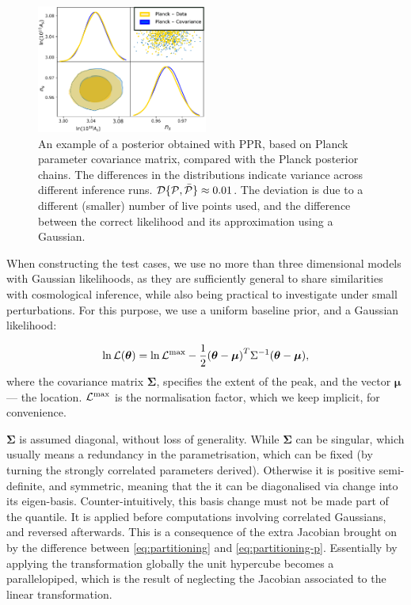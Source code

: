 \documentclass[draft,usenatbib]{mnras}
\begin{document}
\begin{figure}
\includegraphics[width=0.5\textwidth]{./illustrations/triangle-fit.pdf}
\caption{An example of a posterior obtained with PPR, based on
Planck parameter covariance matrix, compared with the Planck
posterior chains. The differences in the distributions indicate
variance across different inference runs.
${\cal D}\{ {\cal P}, \bar{\cal P}\} \approx 0.01$. The deviation
is due to a different (smaller) number of live points used, and
the difference between the correct likelihood and its
approximation using a Gaussian. \label{fig:overlay-posteriors}}
\end{figure}

When constructing the test cases, we use no more than three
dimensional models with Gaussian likelihoods, as they are
sufficiently general to share similarities with cosmological
inference, while also being practical to investigate under small
perturbations.  For this purpose, we use a uniform baseline prior,
and a Gaussian likelihood:

\begin{equation}
\ln {\cal L}(\bm{\theta}) = \ln {\cal L}^\text{max}- \dfrac{1}{2}{(\bm{\theta} - \bm{\mu})}^{T}\Sigma^{-1}(\bm{\theta}-\bm{\mu}),
\end{equation}
where the covariance matrix \(\bm{\Sigma}\), specifies the extent of
the peak, and the vector \(\bm{\mu}\) --- the location.  \({\cal
  L}^\text{max}\) is the normalisation factor, which we keep implicit,
for convenience.

\(\bm{\Sigma}\) is assumed diagonal, without loss of generality. While
\(\bm{\Sigma}\) can be singular, which usually means a redundancy in the
parametrisation, which can be fixed (by turning the strongly
correlated parameters derived). Otherwise it is positive
semi-definite, and symmetric, meaning that the it can be diagonalised
via change into its eigen-basis. Counter-intuitively, this basis change must
not be made part of the quantile. It is applied before computations
involving correlated Gaussians, and reversed afterwards. This is a
consequence of the extra Jacobian brought on by the difference between
\cref{eq:partitioning} and \cref{eq:partitioning-p}. Essentially by
applying the transformation globally the unit hypercube becomes a
parallelopiped, which is the result of neglecting the Jacobian
associated to the linear transformation.
\end{document}
